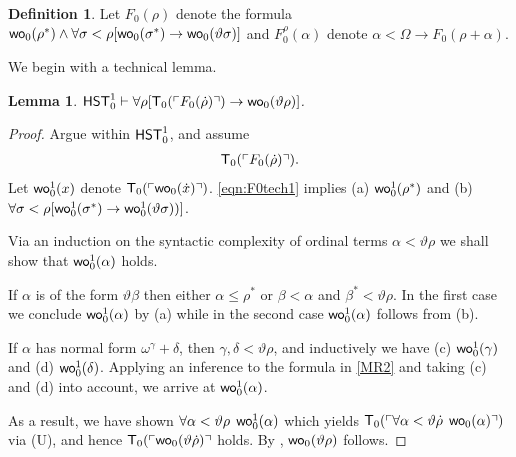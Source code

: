 \documentclass[UKenglish,cleveref,DIV=12]{scrartcl}
\newtheorem{lemma}[theorem]{Lemma}%
\theoremstyle{definition}
\newtheorem{definition}[lemma]{Definition}
\theoremstyle{definition}
\newcommand{\kommentar}[1]{}
\begin{document}
\begin{definition}\label{F0}
	Let $F_0(\rho)$ denote the formula $\mathsf{wo}_0(\rho^*)\land \forall\sigma<\rho[
	\mathsf{wo}_0(\sigma^*)\rightarrow \mathsf{wo}_0(\vartheta\sigma)]$ and $F_0^\rho(\alpha)$ denote
	$\alpha<\Omega\rightarrow F_0(\rho+\alpha)$.
\end{definition}
%
We begin with a technical lemma.
\begin{lemma}\label{lem:F0tech}
	$\mathsf{HST}_0^1\vdash \forall\rho[\mathsf{T}_0(\ulcorner{F_0(\dot\rho)}\urcorner)\rightarrow \mathsf{wo}_0(\vartheta\rho)]$.
\end{lemma}
\begin{proof}
Argue within $\mathsf{HST}_0^1$, and assume
\begin{align}\label{eqn:F0tech1}
  \mathsf{T}_0(\ulcorner{F_0(\dot\rho)}\urcorner).
\end{align}
Let $\mathsf{wo}_0^1(x)$ denote $\mathsf{T}_0(\ulcorner{\mathsf{wo}_0(\dot x)}\urcorner)$.
\eqref{eqn:F0tech1} implies (a) $\mathsf{wo}_0^1(\rho^*)$ and
(b) $\forall\sigma<\rho[\wo_0^1(\sigma^*)\rightarrow\wo_0^1(\vartheta\sigma))]$.

Via an induction on the syntactic complexity of ordinal terms $\alpha<\vartheta\rho$ we shall show that $\mathsf{wo}_0^1(\alpha)$ holds.

If $\alpha$ is of the form $\vartheta\beta$ then either $\alpha\leq \rho^*$ or $\beta<\alpha$ and $\beta^*<\vartheta\rho$. In the first case we conclude 
$\mathsf{wo}_0^1(\alpha)$ by (a) while in the second case $\mathsf{wo}_0^1(\alpha)$ follows from (b).

If $\alpha$ has normal form $\omega^{\gamma}+\delta$, then $\gamma,\delta<\vartheta\rho$, and inductively we have 
(c) $\mathsf{wo}_0^1(\gamma)$ and (d) $\mathsf{wo}_0^1(\delta)$. Applying an inference    \kommentar{$T_0$-Intro} to the formula in \cref{MR2} and taking (c) and (d) into account, we arrive at $\mathsf{wo}_0^1(\alpha)$.

As a result, we have shown $\forall \alpha<\vartheta\rho\,\;  \mathsf{wo}_0^1(\alpha)$ which yields $\mathsf{T}_0(\ulcorner{\forall \alpha<\vartheta\dot{\rho}\,\;\mathsf{wo}_0(\alpha)}\urcorner)$
via (U), and hence
$\mathsf{T}_0(\ulcorner{\mathsf{wo}_0(\vartheta\dot{\rho})}\urcorner$ holds.  By , $\wo_0(\vartheta\rho)$ follows.
\end{proof}


\kommentar{
Let $\gamma_0=\rho^*+1$ and $\gamma_{m+1}=C(\rho,\gamma_m)\cap\Omega$.
Moreover,
\eqref{eqn:F0tech1} implies $\wo_0^1(\gamma_0)$ and
$\forall\sigma<\rho[\wo_0^1(\sigma^*)\rightarrow\wo_0^1(\vartheta\sigma))]$, whence
it is easy to deduce $\forall m[\wo_0^1(\gamma_m)\rightarrow\wo_0^1(\gamma_{m+1})]$
and thus $\wo_0^1(\vartheta\rho)$. By \Del{0}, $\wo_0(\vartheta\rho)$ holds.
}
\end{document}
